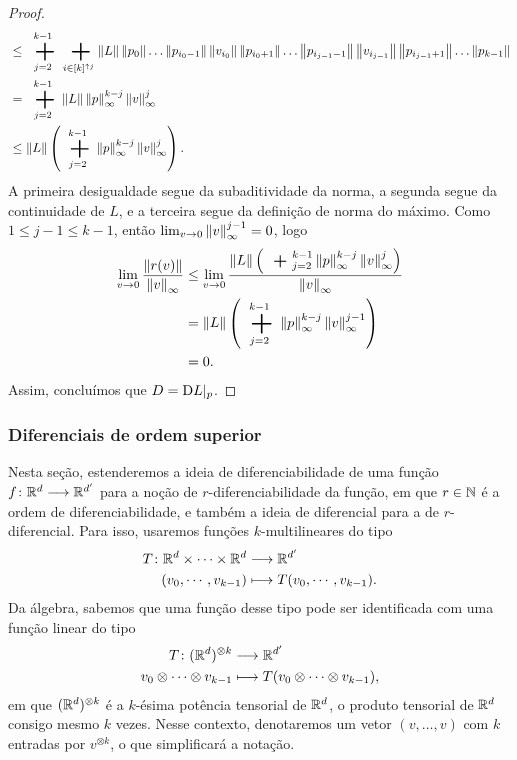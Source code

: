 \begin{proof}
\begin{align*}
		&\leq \sum_{j=2}^{k-1} \sum_{i \in [k]^{\uparrow j}} \nor{L}\nor{p_0}\ldots\nor{p_{i_0-1}}\nor{v_{i_0}}\nor{p_{i_0+1}}\ldots\nor{p_{i_{j-1}-1}}\nor{v_{i_{j-1}}}\nor{p_{i_{j-1}+1}}\ldots\nor{p_{k-1}} \\
		&= \sum_{j=2}^{k-1} \nor{L} \nor{p}_{\infty}^{k-j}\nor{v}_{\infty}^j \\
		&\leq \nor{L} \left( \sum_{j=2}^{k-1} \nor{p}_{\infty}^{k-j}\nor{v}_{\infty}^j \right).
	\end{align*}
A primeira desigualdade segue da subaditividade da norma, a segunda segue da continuidade de $L$, e a terceira segue da definição de norma do máximo. Como $1 \leq j-1 \leq k-1$, então $\lim_{v \to 0} \left\Vert{v}\right\Vert_{\infty}^{j-1} = 0$, logo
	\begin{align*}
	\lim_{v \to 0} \frac{\nor{r(v)}}{\nor{v}_{\infty}} &\leq \lim_{v \to 0} \frac{\nor{L} \left( \sum_{j=2}^{k-1} \nor{p}_{\infty}^{k-j}\nor{v}_{\infty}^j \right)}{\nor{v}_{\infty}} \\
		&= \nor{L} \left( \sum_{j=2}^{k-1} \nor{p}_{\infty}^{k-j}\nor{v}_{\infty}^{j-1} \right) \\
		&= 0.
	\end{align*}
Assim, concluímos que $D = \mathrm{D} L|_p$.
\end{proof}






\subsubsection{Diferenciais de ordem superior}

Nesta seção, estenderemos a ideia de diferenciabilidade de uma função ${f}\colon {\mathbb{R}^d} \longrightarrow {\mathbb{R}^{d'}}$ para a noção de $r$-diferenciabilidade da função, em que $r \in \mathbb{N}$ é a ordem de diferenciabilidade, e também a ideia de diferencial para a de $r$-diferencial. Para isso, usaremos funções $k$-multilineares do tipo
	\begin{align*}
	{T}\colon {\mathbb{R}^d \times \cdots \times \mathbb{R}^d} &\longrightarrow {\mathbb{R}^{d'}} \\{(v_0,\cdots,v_{k-1})} &\longmapsto T(v_0,\cdots,v_{k-1}).
	\end{align*}
Da álgebra, sabemos que uma função desse tipo pode ser identificada com uma função linear do tipo
	\begin{align*}
	{T}\colon {(\mathbb{R}^d)^{\otimes k}} &\longrightarrow {\mathbb{R}^{d'}} \\{v_0 \otimes \cdots \otimes v_{k-1}} &\longmapsto T(v_0 \otimes \cdots \otimes v_{k-1}),
	\end{align*}
em que $(\mathbb{R}^d)^{\otimes k}$ é a $k$-ésima potência tensorial de $\mathbb{R}^d$, o produto tensorial de $\mathbb{R}^d$ consigo mesmo $k$ vezes. Nesse contexto, denotaremos um vetor $(v,\ldots,v)$ com $k$ entradas por $v^{\otimes k}$, o que simplificará a notação.

